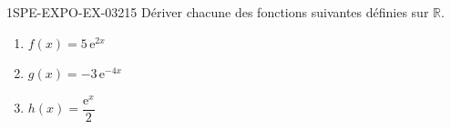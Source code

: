 \begin{exercice}{1SPE-EXPO-EX-032}{1}{5}
Dériver chacune des fonctions suivantes définies sur $\mathbb{R}$.
\begin{enumerate}
\item $f(x) = 5\,\mathrm{e}^{2x}$
\item $g(x) = -3\,\mathrm{e}^{-4x}$
\item $h(x) = \dfrac{\mathrm{e}^{x}}{2}$
\end{enumerate}
\end{exercice}
